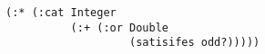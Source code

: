 \begin{lstlisting}[style=reclojureClojure]
(:* (:cat Integer 
          (:+ (:or Double
                   (satisifes odd?)))))
\end{lstlisting}

